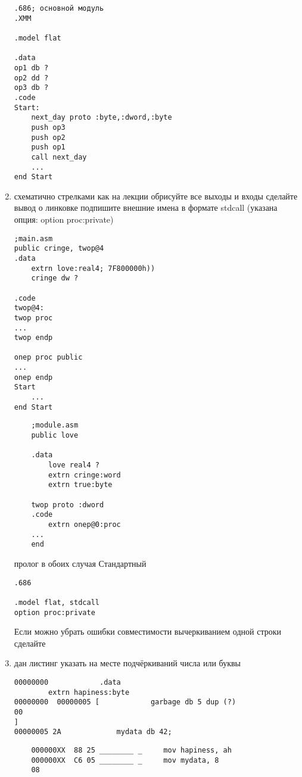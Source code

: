 \documentclass[a4paper,10pt]{article}
\begin{document}
\begin{enumerate}
\begin{verbatim}
.686; основной модуль
.XMM

.model flat

.data 
op1 db ?
op2 dd ?
op3 db ?
.code
Start:
    next_day proto :byte,:dword,:byte
    push op3
    push op2
    push op1
    call next_day
    ...
end Start
\end{verbatim}
    \item схематично стрелками как на лекции обрисуйте все выходы и входы сделайте вывод о линковке подпишите внешние имена в формате stdcall (указана опция: option proc:private)
\begin{multicols}{2}
\begin{verbatim}
;main.asm
public cringe, twop@4
.data
    extrn love:real4; 7F800000h))
    cringe dw ?
    
.code
twop@4:
twop proc
...
twop endp

onep proc public
...
onep endp
Start
    ...
end Start
\end{verbatim}
\columnbreak
\begin{verbatim}
    ;module.asm
    public love
    
    .data
        love real4 ?
        extrn cringe:word
        extrn true:byte
        
    twop proto :dword
    .code
        extrn onep@0:proc
    ...
    end
\end{verbatim}
\end{multicols}
пролог в обоих случая Стандартный
\begin{verbatim}
.686

.model flat, stdcall
option proc:private
\end{verbatim}
    Если можно убрать ошибки совместимости вычеркиванием одной строки сделайте
\item дан листинг указать на месте подчёркиваний числа или буквы
\begin{multicols}{2}
\begin{verbatim}
00000000			.data
        extrn hapiness:byte
00000000  00000005 [		    garbage db 5 dup (?)
00
]
00000005 2A			    mydata db 42; 
\end{verbatim}
\columnbreak
\begin{verbatim}
    000000XX  88 25 ________ _	   mov hapiness, ah
    000000XX  C6 05 ________ _	   mov mydata, 8
    08
\end{verbatim}
\end{multicols}
\end{enumerate}
\end{document}

